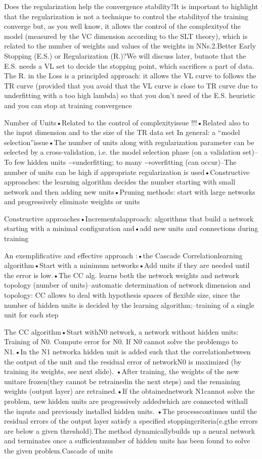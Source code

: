 Does the regularization help the convergence stability?It is important  to highlight that the regularization is not a technique to control the stabilityof the training converge but, as you well know, it allows the control of the complexityof the model  (measured by the VC dimension according to the SLT theory), which is related to the number of weights and values of the weights in NNs.2.Better Early Stopping (E.S.) or Regularization (R.)?We will discuss later, butnote that the E.S. needs a VL set  to decide the stopping point, which sacrifices a part of data. The R. in the Loss is a principled approach: it allows the VL curve to follows the TR curve (provided that you avoid that the VL curve is close to TR curve due to  underfitting with a too high lambda) so that you don’t need of the E.S. heuristic and you can stop at training convergence

Number of Units•Related to the control of complexityissue !!!•Related also to the input dimension and to the size of the TR data set In general: a “model selection”issue•The number of units along with regularization parameter can be selected by a cross-validation, i.e. the model selection phase (on a validation set)–To few hidden units →underfitting; to many →overfitting (can occur)–The number of units can be high if appropriate regularization is used•Constructive approaches: the learning algorithm decides the number starting with small network and then adding new units•Pruning methods: start with large networks and progressively eliminate weights or units

Constructive approaches•Incrementalapproach: algorithms that build a network starting with a minimal configuration and•add new units and connections during training

An exemplificative and effective approach :•the Cascade Correlationlearning algorithm•Start with a minimum networks•Add units if they are needed until the error is low.•The CC alg. learns both the network weights and network topology (number of units)–automatic determination of network dimension and topology: CC allows to deal with hypothesis spaces of flexible size, since the number of hidden units is decided by the learning algorithm;–training of a single unit for each step

The CC algorithm•Start withN0 network, a network without hidden units: Training of N0. Compute error for N0. If N0 cannot solve the problemgo to N1.•In the N1 networka hidden unit is added such that the correlationbetween the output of the unit and the residual error of networkN0 is maximized (by training its weights, see next slide). •After training, the weights of the new unitare frozen(they cannot be retrainedin the next steps) and the remaining weights (output layer) are retrained.•If the obtainednetwork N1cannot solve the problem, new hidden units are progressively addedwhich are connected withall the inputs and previously installed hidden units. •The processcontinues until the residual errors of the output layer satisfy a specified stoppingcriteria(e.gthe errors are below a given threshold).The method dynamicallybuilds up a neural network and terminates once a sufficientnumber of hidden units has been found to solve the given problem.Cascade of units


